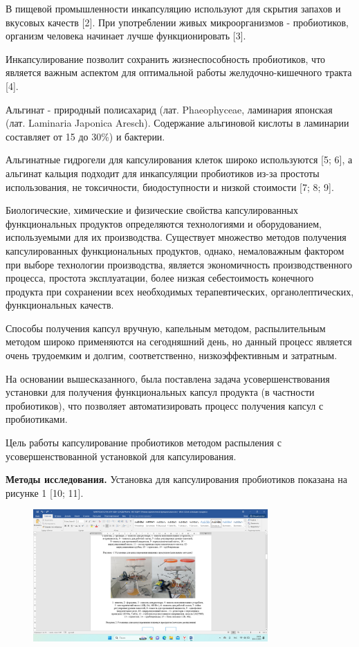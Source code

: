 В пищевой промышленности инкапсуляцию используют для скрытия запахов и
вкусовых качеств {[}2{]}. При употреблении живых микроорганизмов -
пробиотиков, организм человека начинает лучше функционировать {[}3{]}.

Инкапсулирование позволит сохранить жизнеспособность пробиотиков, что
является важным аспектом для оптимальной работы желудочно-кишечного
тракта {[}4{]}.

Альгинат - природный полисахарид (лат. Phaeophyceae, ламинария японская
(лат. Laminaria Japonica Aresch). Содержание альгиновой кислоты в
ламинарии составляет от 15 до 30\%) и бактерии.

Альгинатные гидрогели для капсулирования клеток широко используются
{[}5; 6{]}, а альгинат кальция подходит для инкапсуляции пробиотиков
из-за простоты использования, не токсичности, биодоступности и низкой
стоимости {[}7; 8; 9{]}.

Биологические, химические и физические свойства капсулированных
функциональных продуктов определяются технологиями и оборудованием,
используемыми для их производства. Существует множество методов
получения капсулированных функциональных продуктов, однако, немаловажным
фактором при выборе технологии производства, является экономичность
производственного процесса, простота эксплуатации, более низкая
себестоимость конечного продукта при сохранении всех необходимых
терапевтических, органолептических, функциональных качеств.

Способы получения капсул вручную, капельным методом, распылительным
методом широко применяются на сегодняшний день, но данный процесс
является очень трудоемким и долгим, соответственно, низкоэффективным и
затратным.

На основании вышесказанного, была поставлена задача усовершенствования
установки для получения функциональных капсул продукта (в частности
пробиотиков), что позволяет автоматизировать процесс получения капсул с
пробиотиками.

Цель работы капсулирование пробиотиков методом распыления с
усовершенствованной установкой для капсулирования.

{\bfseries Методы исследования.} Установка для капсулирования пробиотиков
показана на рисунке 1 {[}10; 11{]}.

\begin{figure}[H]
	\centering
	\includegraphics[width=0.8\textwidth]{assets/310}
	\caption*{}
\end{figure}

